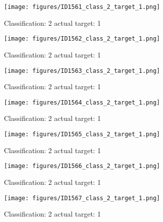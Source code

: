 \begin{figure}[h!]
\begin{center}
\texttt{[image: figures/ID1561\_class\_2\_target\_1.png]}
\end{center}
\caption{ Classification: 2 actual target: 1}
\label{fig:ID1561_class_2_target_1}
\end{figure}
\begin{figure}[h!]
\begin{center}
\texttt{[image: figures/ID1562\_class\_2\_target\_1.png]}
\end{center}
\caption{ Classification: 2 actual target: 1}
\label{fig:ID1562_class_2_target_1}
\end{figure}
\begin{figure}[h!]
\begin{center}
\texttt{[image: figures/ID1563\_class\_2\_target\_1.png]}
\end{center}
\caption{ Classification: 2 actual target: 1}
\label{fig:ID1563_class_2_target_1}
\end{figure}
\begin{figure}[h!]
\begin{center}
\texttt{[image: figures/ID1564\_class\_2\_target\_1.png]}
\end{center}
\caption{ Classification: 2 actual target: 1}
\label{fig:ID1564_class_2_target_1}
\end{figure}
\begin{figure}[h!]
\begin{center}
\texttt{[image: figures/ID1565\_class\_2\_target\_1.png]}
\end{center}
\caption{ Classification: 2 actual target: 1}
\label{fig:ID1565_class_2_target_1}
\end{figure}
\begin{figure}[h!]
\begin{center}
\texttt{[image: figures/ID1566\_class\_2\_target\_1.png]}
\end{center}
\caption{ Classification: 2 actual target: 1}
\label{fig:ID1566_class_2_target_1}
\end{figure}
\begin{figure}[h!]
\begin{center}
\texttt{[image: figures/ID1567\_class\_2\_target\_1.png]}
\end{center}
\caption{ Classification: 2 actual target: 1}
\label{fig:ID1567_class_2_target_1}
\end{figure}
